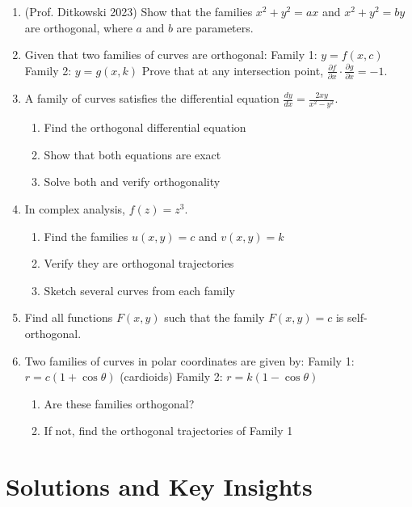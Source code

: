\documentclass[12pt]{article}
\begin{document}
\begin{enumerate}[start=25]
\item (Prof. Ditkowski 2023) Show that the families $x^{2} + y^{2} = ax$ and $x^{2} + y^{2} = by$ are orthogonal, where $a$ and $b$ are parameters.

\item Given that two families of curves are orthogonal:
Family 1: $y = f(x,c)$
Family 2: $y = g(x,k)$
Prove that at any intersection point, $\frac{\partial f}{\partial x} \cdot \frac{\partial g}{\partial x} = -1$.

\item A family of curves satisfies the differential equation $\frac{dy}{dx} = \frac{2xy}{x^{2} - y^{2}}$.
\begin{enumerate}[label=(\alph*)]
    \item Find the orthogonal differential equation
    \item Show that both equations are exact
    \item Solve both and verify orthogonality
\end{enumerate}

\item In complex analysis, $f(z) = z^{3}$.
\begin{enumerate}[label=(\alph*)]
    \item Find the families $u(x,y) = c$ and $v(x,y) = k$
    \item Verify they are orthogonal trajectories
    \item Sketch several curves from each family
\end{enumerate}

\item Find all functions $F(x,y)$ such that the family $F(x,y) = c$ is self-orthogonal.

\item Two families of curves in polar coordinates are given by:
Family 1: $r = c(1 + \cos\theta)$ (cardioids)
Family 2: $r = k(1 - \cos\theta)$
\begin{enumerate}[label=(\alph*)]
    \item Are these families orthogonal?
    \item If not, find the orthogonal trajectories of Family 1
\end{enumerate}
\end{enumerate}

\section*{Solutions and Key Insights}
\end{document}
